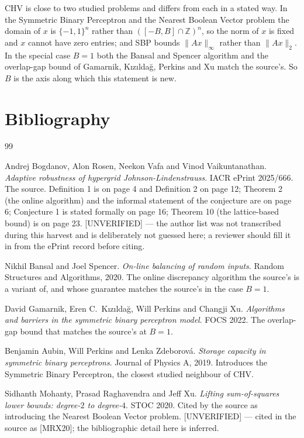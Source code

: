 \documentclass{conjura-conjecture}
\newcommand{\Z}{\mathbb{Z}}
\newcommand{\CHV}{\mathrm{CHV}}
\begin{document}
\begin{remark}\label{rem:neighbours}
$\CHV$ is close to two studied problems and differs from each in a stated
way. In the Symmetric Binary Perceptron and the Nearest Boolean Vector
problem the domain of $x$ is $\{-1,1\}^{n}$ rather than $([-B,B] \cap
\Z)^{n}$, so the norm of $x$ is fixed and $x$ cannot have zero entries;
and SBP bounds $\|Ax\|_{\infty}$ rather than $\|Ax\|_{2}$. In the special
case $B = 1$ both the Bansal and Spencer algorithm and the overlap-gap bound
of Gamarnik, K{\i}z{\i}lda\u{g}, Perkins and Xu match the source's. So
$B$ is the axis along which this statement is new.
\end{remark}

\section{Bibliography}

\begin{conjurabibliography}{99}

Andrej Bogdanov, Alon Rosen, Neekon Vafa and Vinod Vaikuntanathan.
\emph{Adaptive robustness of hypergrid Johnson-Lindenstrauss}.
IACR ePrint 2025/666.
The source. Definition 1 is on page 4 and Definition 2 on page 12;
Theorem 2 (the online algorithm) and the informal statement of the
conjecture are on page 6; Conjecture 1 is stated formally on page 16;
Theorem 10 (the lattice-based bound) is on page 23. [UNVERIFIED] --- the
author list was not transcribed during this harvest and is deliberately
not guessed here; a reviewer should fill it in from the ePrint record
before citing.

Nikhil Bansal and Joel Spencer.
\emph{On-line balancing of random inputs}.
Random Structures and Algorithms, 2020.
The online discrepancy algorithm the source's is a variant of, and whose
guarantee matches the source's in the case $B = 1$.

David Gamarnik, Eren C.\ K{\i}z{\i}lda\u{g}, Will Perkins and Changji Xu.
\emph{Algorithms and barriers in the symmetric binary perceptron model}.
FOCS 2022.
The overlap-gap bound that matches the source's at $B = 1$.

Benjamin Aubin, Will Perkins and Lenka Zdeborov\'a.
\emph{Storage capacity in symmetric binary perceptrons}.
Journal of Physics A, 2019.
Introduces the Symmetric Binary Perceptron, the closest studied
neighbour of $\CHV$.

Sidhanth Mohanty, Prasad Raghavendra and Jeff Xu.
\emph{Lifting sum-of-squares lower bounds: degree-$2$ to degree-$4$}.
STOC 2020.
Cited by the source as introducing the Nearest Boolean Vector problem.
[UNVERIFIED] --- cited in the source as [MRX20]; the bibliographic detail
here is inferred.

\end{conjurabibliography}
\end{document}
